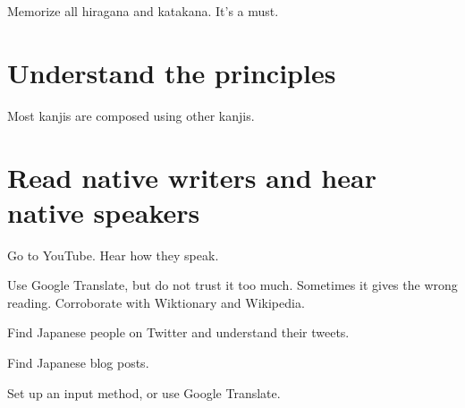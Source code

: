 \documentclass[12pt,openany]{book}
\begin{document}
Memorize all hiragana and katakana.
It's a must.

\section{Understand the principles}

Most kanjis are composed using other kanjis.

\section{Read native writers and hear native speakers}

Go to YouTube.
Hear how they speak.

Use Google Translate, but do not trust it too much.
Sometimes it gives the wrong reading.
Corroborate with Wiktionary and Wikipedia.

Find Japanese people on Twitter and understand their tweets.

Find Japanese blog posts.

Set up an input method, or use Google Translate.

\newcommand\myspacing{0.5em}
\newcommand\sbs[2]{%
    {%
        \parindent0em%
        \par%
        \vspace{\myspacing}%
        \begin{tabularx}{\linewidth}{XX}%
            {\fontsize{12pt}{12pt}\selectfont#1}%
            &%
            {\fontsize{10pt}{12pt}\selectfont#2}%
        \end{tabularx}%
        \vspace{\myspacing}%
        \par%
    }%
}



























\end{document}
